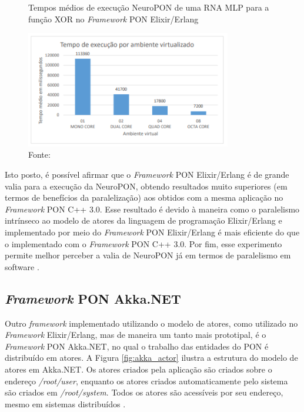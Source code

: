 \begin{figure}[!htb]
  \centering
  \smallskip
  \caption{Tempos médios de execução NeuroPON de uma RNA MLP para a função XOR
  no \textit{Framework} PON Elixir/Erlang}
  \includegraphics[width=0.8\textwidth]{../figures/neuropon_elixir.png}
    \smallskip
    \caption*{Fonte:
  }
  \label{fig:neuropon_elixir}
\end{figure}

Isto posto, é possível afirmar que o \textit{Framework} PON Elixir/Erlang é de
grande valia para a execução da NeuroPON, obtendo resultados muito superiores
(em termos de benefícios da paralelização) aos obtidos com a mesma aplicação no
\textit{Framework} PON C++ 3.0. Esse resultado é devido à maneira como o
paralelismo intrínseco ao modelo de atores da linguagem de programação
Elixir/Erlang e implementado por meio do \textit{Framework} PON Elixir/Erlang é
mais eficiente do que o implementado com o \textit{Framework} PON C++ 3.0. Por
fim, esse experimento permite melhor perceber a valia de NeuroPON já em termos
de paralelismo em software \cite{doc_Schutz_2019}.

\subsection{\textit{Framework} PON Akka.NET}\label{sec:akka}

Outro \textit{framework} implementado utilizando o modelo de atores, como
utilizado no \textit{Framework} Elixir/Erlang, mas de maneira um tanto mais
prototipal, é o \textit{Framework} PON Akka.NET, no qual o trabalho das
entidades do PON é distribuído em atores. A Figura \ref{fig:akka_actor} ilustra
a estrutura do modelo de atores em Akka.NET. Os atores criados pela aplicação
são criados sobre o endereço \textit{/root/user}, enquanto os atores criados
automaticamente pelo sistema são criados em \textit{/root/system}. Todos os
atores são acessíveis por seu endereço, mesmo em sistemas distribuídos
\cite{martini_2019}.

